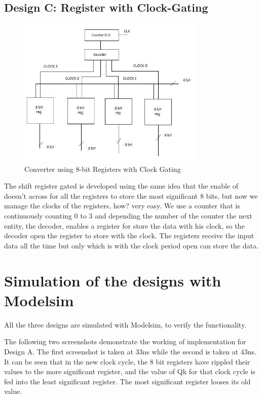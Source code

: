\documentclass[11pt,a4paper]{article}
\begin{document}
\subsection{Design C: Register with Clock-Gating}

\begin{figure}[htp]
\centering
\includegraphics[width = 3.5in]{./images/shiftregistergated.jpg}
\caption{Converter using 8-bit Registers with Clock Gating}
\end{figure}

The shift register gated is developed using the same idea that the enable of doesn't across for all the registers to store the most significant 8 bits, but now we manage the clocks of the registers, how? very easy. We use a counter that is continuously counting 0 to 3 and depending the number of the counter the next entity, the decoder, enables a register for store the data with his clock, so the decoder open the register to store with the clock. The registers receive the input data all the time but only which is with the clock period open can store the data.


\newpage
\section{Simulation of the designs with Modelsim}
\label{section:simulation}
All the three designs are simulated with Modelsim, to verify the functionality.
 
The following two screenshots demonstrate the working of implementation for Design A. The first screenshot is taken at 33ns while the second is taken at 43ns. It can be seen that in the new clock cycle, the 8 bit registers have rippled their values to the more significant register, and the value of Qk for that clock cycle is fed into the least significant register. The most significant register looses its old value.
\end{document}
